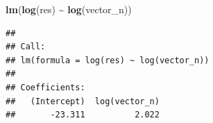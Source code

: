 \documentclass[
]{article}
\newenvironment{Shaded}{\begin{snugshade}}{\end{snugshade}}
\newcommand{\FunctionTok}[1]{\textcolor[rgb]{0.13,0.29,0.53}{\textbf{#1}}}
\newcommand{\NormalTok}[1]{#1}
\newcommand{\SpecialCharTok}[1]{\textcolor[rgb]{0.81,0.36,0.00}{\textbf{#1}}}
\begin{document}
\begin{Shaded}
\begin{Highlighting}[]
\FunctionTok{lm}\NormalTok{(}\FunctionTok{log}\NormalTok{(res) }\SpecialCharTok{\textasciitilde{}} \FunctionTok{log}\NormalTok{(vector\_n))}
\end{Highlighting}
\end{Shaded}

\begin{verbatim}
## 
## Call:
## lm(formula = log(res) ~ log(vector_n))
## 
## Coefficients:
##   (Intercept)  log(vector_n)  
##       -23.311          2.022
\end{verbatim}
\end{document}
